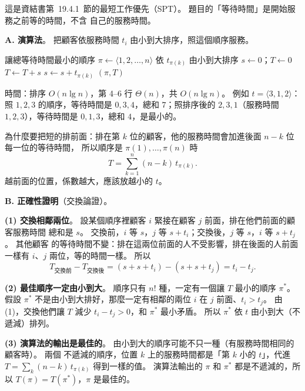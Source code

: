 \begin{pastsoln}
這是資結書第~19.4.1~節的最短工作優先（SPT）。 題目的「等待時間」是開始服務之前等的時間，不含
自己的服務時間。

\textbf{A. 演算法}。 把顧客依服務時間 $t_i$ 由小到大排序，照這個順序服務。
\begin{pseudo}[unbreakable]{讓總等待時間最小的順序}
    \State $\pi \gets \langle 1, 2, \ldots, n \rangle$ 依 $t_{\pi(k)}$ 由小到大排序 
    \State $s \gets 0$；$T \gets 0$ 
        \State $T \gets T + s$ 
        \State $s \gets s + t_{\pi(k)}$
    \EndFor
    \State \Return $(\pi, T)$
\EndFunction
\end{pseudo}
時間：排序 $O(n \lg n)$，第 4--6 行 $\Theta(n)$，共 $O(n \lg n)$。 例如 $t = \langle 3, 1, 2
\rangle$：照 $1, 2, 3$ 的順序，等待時間是 $0, 3, 4$，總和 $7$；照排序後的 $2, 3, 1$（服務時間
$1, 2, 3$），等待時間是 $0, 1, 3$，總和 $4$，是最小的。

為什麼要把短的排前面：排在第 $k$ 位的顧客，他的服務時間會加進後面 $n - k$ 位每一位的等待時間，
所以順序是 $\pi(1), \ldots, \pi(n)$ 時
\[
T = \sum_{k=1}^{n} (n - k)\, t_{\pi(k)}.
\]
越前面的位置，係數越大，應該放越小的 $t$。

\textbf{B. 正確性證明}（交換論證）。

\textbf{(1) 交換相鄰兩位}。 設某個順序裡顧客 $i$ 緊接在顧客 $j$ 前面，排在他們前面的顧客服務時間
總和是 $s$。 交換前，$i$ 等 $s$，$j$ 等 $s + t_i$；交換後，$j$ 等 $s$，$i$ 等 $s + t_j$。 其他顧客
的等待時間不變：排在這兩位前面的人不受影響，排在後面的人前面一樣有 $i$、$j$ 兩位，等的時間一樣。
所以
\[
T_{\text{交換前}} - T_{\text{交換後}} = (s + s + t_i) - (s + s + t_j) = t_i - t_j.
\]

\textbf{(2) 最佳順序一定由小到大}。 順序只有 $n!$ 種，一定有一個讓 $T$ 最小的順序 $\pi^*$。 假設
$\pi^*$ 不是由小到大排好，那麼一定有相鄰的兩位 $i$ 在 $j$ 前面、$t_i > t_j$。 由 (1)，交換他們讓
$T$ 減少 $t_i - t_j > 0$，和 $\pi^*$ 最小矛盾。 所以 $\pi^*$ 依 $t$ 由小到大（不遞減）排列。

\textbf{(3) 演算法的輸出是最佳的}。 由小到大的順序可能不只一種（有服務時間相同的顧客時）。 兩個
不遞減的順序，位置 $k$ 上的服務時間都是「第 $k$ 小的 $t$」，代進 $T = \sum_k (n-k)\,t_{\pi(k)}$
得到一樣的值。 演算法輸出的 $\pi$ 和 $\pi^*$ 都是不遞減的，所以 $T(\pi) = T(\pi^*)$，$\pi$ 是最佳的。
\end{pastsoln}
